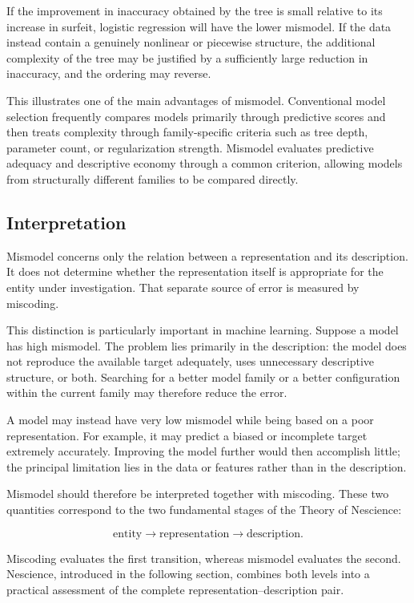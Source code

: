 \begin{example}
If the improvement in inaccuracy obtained by the tree is small relative to its
increase in surfeit, logistic regression will have the lower mismodel. If the
data instead contain a genuinely nonlinear or piecewise structure, the additional
complexity of the tree may be justified by a sufficiently large reduction in
inaccuracy, and the ordering may reverse.

This illustrates one of the main advantages of mismodel. Conventional model
selection frequently compares models primarily through predictive scores and
then treats complexity through family-specific criteria such as tree depth,
parameter count, or regularization strength. Mismodel evaluates predictive
adequacy and descriptive economy through a common criterion, allowing models
from structurally different families to be compared directly.
\end{example}

\subsection*{Interpretation}

Mismodel concerns only the relation between a representation and its
description. It does not determine whether the representation itself is
appropriate for the entity under investigation. That separate source of error is
measured by miscoding.

This distinction is particularly important in machine learning. Suppose a model
has high mismodel. The problem lies primarily in the description: the model
does not reproduce the available target adequately, uses unnecessary descriptive
structure, or both. Searching for a better model family or a better configuration
within the current family may therefore reduce the error.

A model may instead have very low mismodel while being based on a poor
representation. For example, it may predict a biased or incomplete target
extremely accurately. Improving the model further would then accomplish little;
the principal limitation lies in the data or features rather than in the
description.

Mismodel should therefore be interpreted together with miscoding. These two
quantities correspond to the two fundamental stages of the Theory of Nescience:

\[
\text{entity}
\longrightarrow
\text{representation}
\longrightarrow
\text{description}.
\]

Miscoding evaluates the first transition, whereas mismodel evaluates the
second. Nescience, introduced in the following section, combines both levels
into a practical assessment of the complete representation--description pair.

